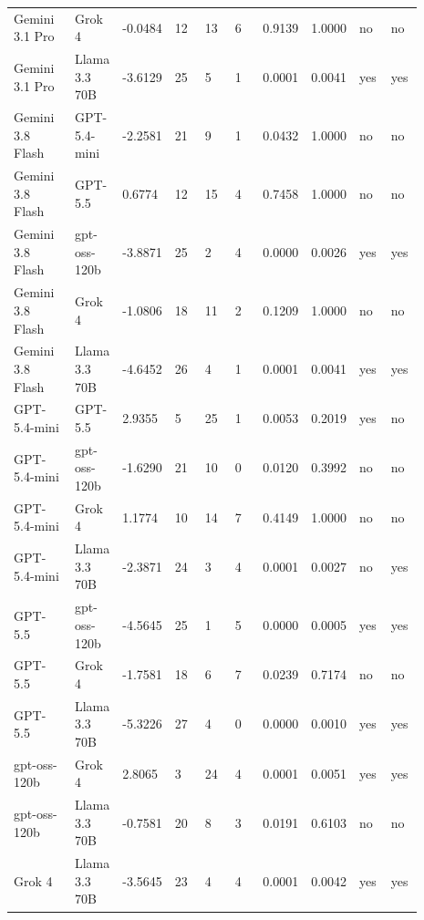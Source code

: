 \begin{landscape}
\begin{longtable}{p{0.162\linewidth}p{0.081\linewidth}p{0.081\linewidth}p{0.081\linewidth}p{0.081\linewidth}p{0.081\linewidth}p{0.081\linewidth}p{0.081\linewidth}p{0.081\linewidth}p{0.081\linewidth}}
Gemini 3.1 Pro & Grok 4 & -0.0484 & 12 & 13 & 6 & 0.9139 & 1.0000 & no & no \\
Gemini 3.1 Pro & Llama 3.3 70B & -3.6129 & 25 & 5 & 1 & 0.0001 & 0.0041 & yes & yes \\
Gemini 3.8 Flash & GPT-5.4-mini & -2.2581 & 21 & 9 & 1 & 0.0432 & 1.0000 & no & no \\
Gemini 3.8 Flash & GPT-5.5 & 0.6774 & 12 & 15 & 4 & 0.7458 & 1.0000 & no & no \\
Gemini 3.8 Flash & gpt-oss-120b & -3.8871 & 25 & 2 & 4 & 0.0000 & 0.0026 & yes & yes \\
Gemini 3.8 Flash & Grok 4 & -1.0806 & 18 & 11 & 2 & 0.1209 & 1.0000 & no & no \\
Gemini 3.8 Flash & Llama 3.3 70B & -4.6452 & 26 & 4 & 1 & 0.0001 & 0.0041 & yes & yes \\
GPT-5.4-mini & GPT-5.5 & 2.9355 & 5 & 25 & 1 & 0.0053 & 0.2019 & yes & no \\
GPT-5.4-mini & gpt-oss-120b & -1.6290 & 21 & 10 & 0 & 0.0120 & 0.3992 & no & no \\
GPT-5.4-mini & Grok 4 & 1.1774 & 10 & 14 & 7 & 0.4149 & 1.0000 & no & no \\
GPT-5.4-mini & Llama 3.3 70B & -2.3871 & 24 & 3 & 4 & 0.0001 & 0.0027 & no & yes \\
GPT-5.5 & gpt-oss-120b & -4.5645 & 25 & 1 & 5 & 0.0000 & 0.0005 & yes & yes \\
GPT-5.5 & Grok 4 & -1.7581 & 18 & 6 & 7 & 0.0239 & 0.7174 & no & no \\
GPT-5.5 & Llama 3.3 70B & -5.3226 & 27 & 4 & 0 & 0.0000 & 0.0010 & yes & yes \\
gpt-oss-120b & Grok 4 & 2.8065 & 3 & 24 & 4 & 0.0001 & 0.0051 & yes & yes \\
gpt-oss-120b & Llama 3.3 70B & -0.7581 & 20 & 8 & 3 & 0.0191 & 0.6103 & no & no \\
Grok 4 & Llama 3.3 70B & -3.5645 & 23 & 4 & 4 & 0.0001 & 0.0042 & yes & yes \\
\bottomrule
\end{longtable}
\normalsize
\end{landscape}
